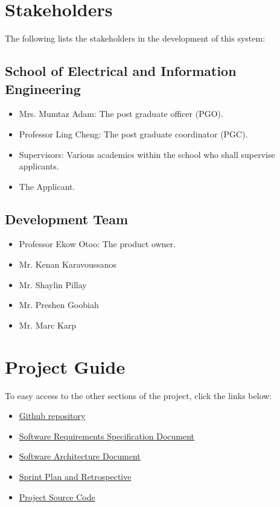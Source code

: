 \documentclass[11pt]{article}
\begin{document}
\section{Stakeholders}
The following lists the stakeholders in the development of this system:

\subsection{School of Electrical and Information Engineering}
\begin{itemize}
	
	
	
	\item Mrs. Mumtaz Adam: The post graduate officer (PGO).
	
	\item Professor Ling Cheng: The post graduate coordinator (PGC).
	
	\item Supervisors: Various academics within the school who shall supervise applicants.
	
	\item The Applicant.
	
\end{itemize}

\subsection{Development Team}
\begin{itemize}
	\item Professor Ekow Otoo: The product owner.
	\item Mr. Kenan Karavoussanos
	\item Mr. Shaylin Pillay
	\item Mr. Preshen Goobiah
	\item Mr. Marc Karp
	
\end{itemize}

\section{Project Guide}
To easy access to the other sections of the project, click the links below:
\begin{itemize}


\item \href{https://github.com/KenanKarav/COMS3002.git}{Github repository}
\item \href{https://github.com/KenanKarav/}{Software Requirements Specification Document}
\item \href{https://github.com/KenanKarav/}{Software Architecture Document}
\item \href{https://github.com/KenanKarav/}{Sprint Plan and Retrospective}
\item \href{https://github.com/KenanKarav/}{Project Source Code}
\end{itemize}
\end{document}
